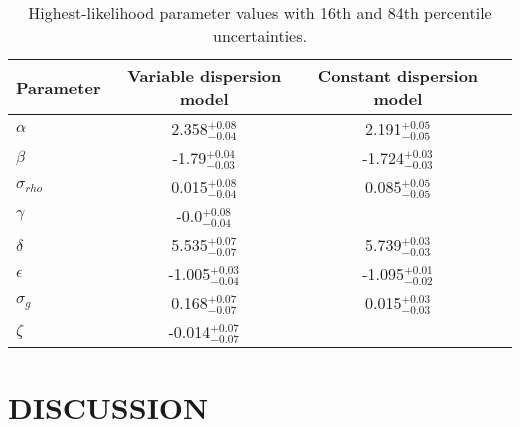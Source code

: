 \documentclass[apjl]{emulateapj}
\begin{document}
\begin{table}
\caption{Highest-likelihood parameter values with 16th and 84th
	percentile uncertainties.}
\begin{tabular}{lccc}
\hline\hline
Parameter & Variable dispersion model & Constant dispersion model \\
    \hline
$\alpha$ &    2.358$_{-0.04}^{+0.08}$ &       2.191$_{-0.05}^{+0.05}$  \\
$\beta$ &    -1.79$_{-0.03}^{+0.04}$ &        -1.724$_{-0.03}^{+0.03}$ \\
$\sigma_{rho}$ &    0.015$_{-0.04}^{+0.08}$ &   0.085$_{-0.05}^{+0.05}$  \\
$\gamma$ &    -0.0$_{-0.04}^{+0.08}$ & \\
\hline
$\delta$ &    5.535$_{-0.07}^{+0.07}$ &      5.739$_{-0.03}^{+0.03}$  \\
$\epsilon$ &    -1.005$_{-0.04}^{+0.03}$ &   -1.095$_{-0.02}^{+0.01}$ \\
$\sigma_g$ &    0.168$_{-0.07}^{+0.07}$ &    0.015$_{-0.03}^{+0.03}$  \\
$\zeta$ &    -0.014$_{-0.07}^{+0.07}$ & \\
    \hline
\end{tabular}
\end{table}
\label{tab:results}

\section{DISCUSSION}
\label{sec:discussion}

\end{document}
